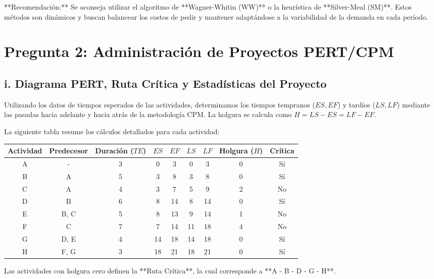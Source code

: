 \documentclass[11pt, a4paper]{article}
\begin{document}
**Recomendación:** Se aconseja utilizar el algoritmo de **Wagner-Whitin (WW)** o la heurística de **Silver-Meal (SM)**. Estos métodos son dinámicos y buscan balancear los costos de pedir y mantener adaptándose a la variabilidad de la demanda en cada período.

\newpage

\section*{Pregunta 2: Administración de Proyectos PERT/CPM}

\subsection*{i. Diagrama PERT, Ruta Crítica y Estadísticas del Proyecto}

Utilizando los datos de tiempos esperados de las actividades, determinamos los tiempos tempranos ($ES, EF$) y tardíos ($LS, LF$) mediante las pasadas hacia adelante y hacia atrás de la metodología CPM. La holgura se calcula como $H = LS - ES = LF - EF$.

La siguiente tabla resume los cálculos detallados para cada actividad:
\begin{center}
  \small
  \begin{tabular}{ccccccccc}
    \toprule
    Actividad & Predecesor & Duración ($TE$) & $ES$ & $EF$ & $LS$ & $LF$ & Holgura ($H$) & Crítica \\
    \midrule
    A & - & 3 & 0 & 3 & 0 & 3 & 0 & Sí \\
    B & A & 5 & 3 & 8 & 3 & 8 & 0 & Sí \\
    C & A & 4 & 3 & 7 & 5 & 9 & 2 & No \\
    D & B & 6 & 8 & 14 & 8 & 14 & 0 & Sí \\
    E & B, C & 5 & 8 & 13 & 9 & 14 & 1 & No \\
    F & C & 7 & 7 & 14 & 11 & 18 & 4 & No \\
    G & D, E & 4 & 14 & 18 & 14 & 18 & 0 & Sí \\
    H & F, G & 3 & 18 & 21 & 18 & 21 & 0 & Sí \\
    \bottomrule
  \end{tabular}
\end{center}

Las actividades con holgura cero definen la **Ruta Crítica**, la cual corresponde a **A - B - D - G - H**.
\end{document}
